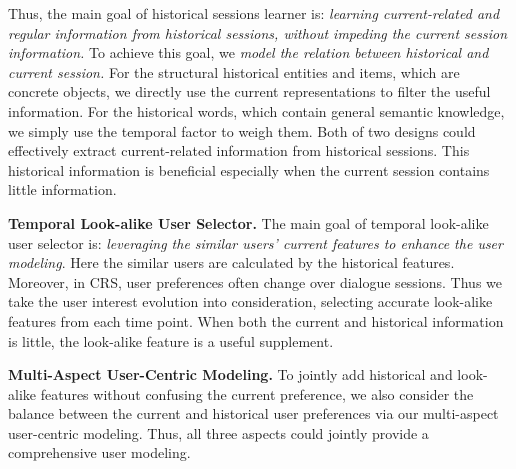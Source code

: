 \documentclass[sigconf,natbib=true]{acmart}
\begin{document}
Thus, the main goal of historical sessions learner is: \textit{learning current-related and regular information from historical sessions, without impeding the current session information.} To achieve this goal, we \textit{model the relation between historical and current session.} For the structural historical entities and items, which are concrete objects, we directly use the current representations to filter the useful information. For the historical words, which contain general semantic knowledge, we simply use the temporal factor to weigh them. Both of two designs could effectively extract current-related information from historical sessions. This historical information is beneficial especially when the current session contains little information.

\noindent
\textbf{Temporal Look-alike User Selector.} The main goal of temporal look-alike user selector is: \textit{leveraging the similar users' current features to enhance the user modeling}. Here the similar users are calculated by the historical features. Moreover, in CRS, user preferences often change over dialogue sessions. Thus we take the user interest evolution into consideration, selecting accurate look-alike features from each time point. When both the current and historical information is little, the look-alike feature is a useful supplement.

\noindent
\textbf{Multi-Aspect User-Centric Modeling.} To jointly add historical and look-alike features without confusing the current preference, we also consider the balance between the current and historical user preferences via our multi-aspect user-centric modeling. Thus, all three aspects could jointly provide a comprehensive user modeling.
\end{document}
